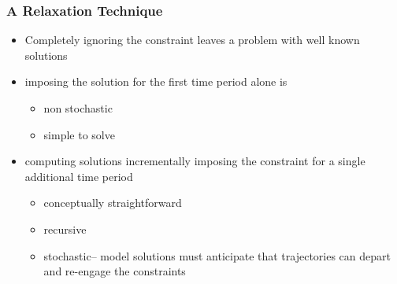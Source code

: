 \documentclass{beamer}
\begin{document}
   \begin{frame}
     \frametitle{A Relaxation Technique}
     
     \begin{itemize}
     	\item Completely ignoring the constraint leaves a problem with well known solutions\citep{anderson10,simssolving}
      \item imposing the solution for the first time period alone is 
      \begin{itemize}
      	\item non stochastic
      	\item simple to solve
      \end{itemize}
      \item computing solutions incrementally imposing the constraint for a single additional time period
      \begin{itemize}
      	\item conceptually straightforward 
      	\item recursive 
      	\item stochastic-- model solutions must anticipate that trajectories can depart and re-engage the constraints  
      \end{itemize}

\end{itemize}
\end{frame}
\end{document}
